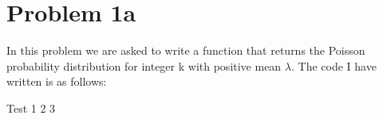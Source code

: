 \section{Problem 1a}

In this problem we are asked to write a function that returns the Poisson probability distribution for integer k with positive mean $\lambda$. The code I have written is as follows: 

%

Test 1 2 3 

%